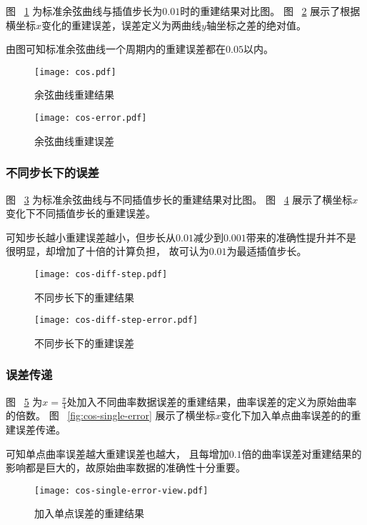 图 ~\ref{fig:cos} 为标准余弦曲线与插值步长为$0.01$时的重建结果对比图。
图 ~\ref{fig:cos-error} 展示了根据横坐标$x$变化的重建误差，误差定义为两曲线$y$轴坐标之差的绝对值。

由图可知标准余弦曲线一个周期内的重建误差都在$0.05$以内。


\begin{figure}
\centering
\texttt{[image: cos.pdf]}
\caption{余弦曲线重建结果}
\label{fig:cos}
\end{figure}

\begin{figure}
\centering
\texttt{[image: cos-error.pdf]}
\caption{余弦曲线重建误差}
\label{fig:cos-error}
\end{figure}

\subsubsection{不同步长下的误差}

图 ~\ref{fig:cos-diff-step} 为标准余弦曲线与不同插值步长的重建结果对比图。
图 ~\ref{fig:cos-diff-step-error} 展示了横坐标$x$变化下不同插值步长的重建误差。

可知步长越小重建误差越小，但步长从$0.01$减少到$0.001$带来的准确性提升并不是很明显，却增加了十倍的计算负担，
故可认为$0.01$为最适插值步长。

\begin{figure}
\centering
\texttt{[image: cos-diff-step.pdf]}
\caption{不同步长下的重建结果}
\label{fig:cos-diff-step}
\end{figure}

\begin{figure}
\centering
\texttt{[image: cos-diff-step-error.pdf]}
\caption{不同步长下的重建误差}
\label{fig:cos-diff-step-error}
\end{figure}

\subsubsection{误差传递}

图 ~\ref{fig:cos-single-error-view} 为$x = \frac{\pi}{4}$处加入不同曲率数据误差的重建结果，曲率误差的定义为原始曲率的倍数。
图 ~\ref{fig:cos-single-error} 展示了横坐标$x$变化下加入单点曲率误差的的重建误差传递。

可知单点曲率误差越大重建误差也越大，
且每增加$0.1$倍的曲率误差对重建结果的影响都是巨大的，故原始曲率数据的准确性十分重要。

\begin{figure}
\centering
\texttt{[image: cos-single-error-view.pdf]}
\caption{加入单点误差的重建结果}
\label{fig:cos-single-error-view}
\end{figure}

